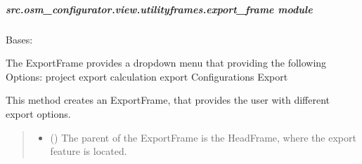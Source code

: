 \documentclass[letterpaper,10pt,english]{sphinxmanual}
\begin{document}
\subparagraph{src.osm\_configurator.view.utilityframes.export\_frame module}
\label{\detokenize{apidoc/src.osm_configurator.view.utilityframes:module-src.osm_configurator.view.utilityframes.export_frame}}\label{\detokenize{apidoc/src.osm_configurator.view.utilityframes:src-osm-configurator-view-utilityframes-export-frame-module}}

\begin{fulllineitems}
\label{\detokenize{apidoc/src.osm_configurator.view.utilityframes:src.osm_configurator.view.utilityframes.export_frame.ExportFrame}}
\pysigstartsignatures
{}
\pysigstopsignatures
\sphinxAtStartPar
Bases: 

\sphinxAtStartPar
The ExportFrame provides a dropdown menu that providing the following Options:
\sphinxhyphen{} project export
\sphinxhyphen{} calculation export
\sphinxhyphen{} Configurations Export

\begin{fulllineitems}
\label{\detokenize{apidoc/src.osm_configurator.view.utilityframes:src.osm_configurator.view.utilityframes.export_frame.ExportFrame.__init__}}
\pysigstartsignatures
{}
\pysigstopsignatures
\sphinxAtStartPar
This method creates an ExportFrame, that provides the user with different export options.
\begin{quote}\begin{description}
\begin{itemize}
\item {} 
\sphinxAtStartPar
{} ({\hyperref[\detokenize{apidoc/src.osm_configurator.view.toplevelframes:src.osm_configurator.view.toplevelframes.project_head_frame.ProjectHeadFrame}]{}}) \textendash{} The parent of the ExportFrame is the HeadFrame, where the export feature is located.


\end{itemize}
\end{description}
\end{quote}
\end{fulllineitems}
\end{fulllineitems}
\end{document}
